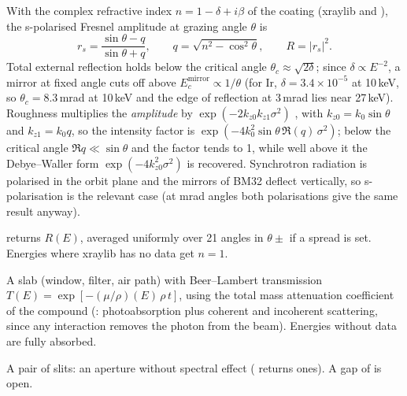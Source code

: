  With the complex refractive index $n = 1-\delta+i\beta$ of the coating (xraylib
 and ), the s-polarised Fresnel amplitude at grazing angle
$\theta$ is \citep{Parratt1954,AlsNielsen2011}
\begin{equation}
  r_s = \frac{\sin\theta - q}{\sin\theta + q}, \qquad q = \sqrt{n^2-\cos^2\theta},
  \qquad R = |r_s|^2 .
\end{equation}
Total external reflection holds below the critical angle $\theta_c \approx \sqrt{2\delta}$;
since $\delta\propto E^{-2}$, a mirror at fixed angle cuts off above $E_c^\mathrm{mirror}
\propto 1/\theta$ (for Ir, $\delta = 3.4\times10^{-5}$ at 10\,keV, so $\theta_c = 8.3$\,mrad at
10\,keV and the edge of reflection at 3\,mrad lies near 27\,keV). Roughness multiplies the
\emph{amplitude} by $\exp(-2k_{z0}k_{z1}\sigma^2)$ \citep{Nevot1980}, with $k_{z0} =
k_0\sin\theta$ and $k_{z1} = k_0 q$, so the intensity factor is
$\exp(-4k_0^2\sin\theta\,\Re(q)\,\sigma^2)$; below the critical angle $\Re q \ll \sin\theta$
and the factor tends to 1, while well above it the Debye--Waller form
$\exp(-4k_{z0}^2\sigma^2)$ is recovered. Synchrotron radiation is polarised in the orbit
plane and the mirrors of BM32 deflect vertically, so s-polarisation is the relevant case
(at mrad angles both polarisations give the same result anyway).

 returns $R(E)$, averaged uniformly over 21 angles in $\theta \pm$
 if a spread is set. Energies where xraylib has no data get $n=1$.

A slab (window, filter, air path) with Beer--Lambert transmission
$T(E) = \exp[-(\mu/\rho)(E)\,\rho\,t]$, using the total mass attenuation coefficient of the
compound (: photoabsorption plus coherent and incoherent scattering, since any
interaction removes the photon from the beam). Energies without data are fully absorbed.

A pair of slits: an aperture without spectral effect ( returns ones). A gap of
 is open.


